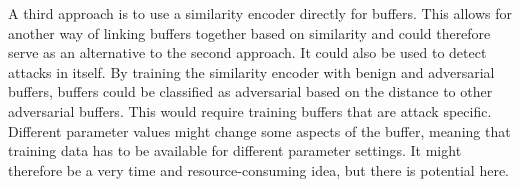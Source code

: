 A third approach is to use a similarity encoder directly for buffers. This allows for another way of linking buffers together based on similarity and could therefore serve as an alternative to the second approach. It could also be used to detect attacks in itself. By training the similarity encoder with benign and adversarial buffers, buffers could be classified as adversarial based on the distance to other adversarial buffers. This would require training buffers that are attack specific. Different parameter values might change some aspects of the buffer, meaning that training data has to be available for different parameter settings. It might therefore be a very time and resource-consuming idea, but there is potential here.\\%